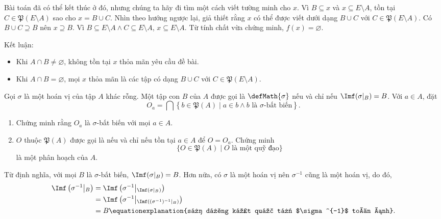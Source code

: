 Bài toán đã có thể kết thúc ở đó, nhưng chúng ta hãy đi tìm một cách viết tường minh cho $x$. Vì $B \subseteq x$ và $x \subseteq E \setminus A$, tồn tại $C \in \mathfrak{P}(E \setminus A)$ sao cho $x = B \cup C$. Nhìn theo hướng ngược lại, giả thiết rằng $x$ có thể được viết dưới dạng $B \cup C$ với $C \in \mathfrak{P}(E \setminus A)$. Có $B \cup C \supseteq B$ nên $x \supseteq B$. Vì $B \subseteq E \setminus A \land C \subseteq E \setminus A$, $x \subseteq E \setminus A$. Từ tính chất vừa chứng minh, $f(x) = \varnothing$.

Kết luận:
\begin{itemize}
   \item Khi $A \cap B \neq \varnothing$, không tồn tại $x$ thỏa mãn yêu cầu đề bài.
   \item Khi $A \cap B = \varnothing$, mọi $x$ thỏa mãn là các tập có dạng $B \cup C$ với $C \in \mathfrak{P}(E \setminus A)$.
\end{itemize}

\exercise Gọi $\sigma$ là một hoán vị của tập $A$ khác rỗng. Một tập con $B$ của $A$ được gọi là $\defMath{\sigma}$ nếu và chỉ nếu $\Imf(\sigma|_B) = B$. Với $a \in A$, đặt \begin{equation*}
   O_a = \bigcap\left\{b \in \mathfrak{P}(A) \mid a \in b \land b \text{~là $\sigma$-bất biến}\right\}.
\end{equation*}
\begin{enumerate}
   \item Chứng minh rằng $O_a$ là $\sigma$-bất biến với mọi $a \in A$.
   \item $O$ thuộc $\mathfrak{P}(A)$ được gọi là  nếu và chỉ nếu tồn tại $a \in A$ để $O = O_a$. Chứng minh \begin{equation*}
      \{O \in \mathfrak{P}(A) \mid O \text{~là một quỹ đạo}\}
   \end{equation*}
   là một phân hoạch của $A$.
\end{enumerate}

\solution 

\resetSubexercise Từ định nghĩa, với mọi $B$ là $\sigma$-bất biến, $\Imf(\sigma|_B) = B$. Hơn nữa, có $\sigma$ là một hoán vị nên $\sigma^{-1}$ cũng là một hoán vị, do đó, 
\begin{align*}
   \Imf\left(\sigma^{-1}\middle|_B\right) &= \Imf\left(\sigma^{-1}\middle|_{\Imf(\sigma|_B)}\right) \\
   &= \Imf\left(\sigma^{-1}\middle|_{\Imf\left((\sigma^{-1})^{-1}\middle|_B\right)}\right) \\
   &= B \equationexplanation{sử dụng kết quả từ $\sigma^{-1}$ toàn ánh}.
\end{align*} 

